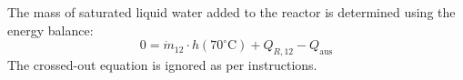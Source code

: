 The mass of saturated liquid water added to the reactor is determined using the energy balance:  
\[
0 = \dot{m}_{12} \cdot h(70^\circ\text{C}) + Q_{R,12} - Q_{\text{aus}}
\]  
The crossed-out equation is ignored as per instructions.